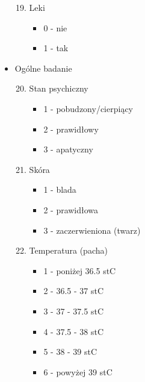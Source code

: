 \documentclass{report}
\begin{document}
\begin{itemize}
        \begin{enumerate}
            \setcounter{enumi}{18}
            \item Leki
            \begin{itemize}
                \item 0 - nie
                \item 1 - tak
            \end{itemize}
        \end{enumerate}
        \item Ogólne badanie
        \begin{enumerate}
            \setcounter{enumi}{19}
            \item Stan psychiczny
            \begin{itemize}
                \item 1 - pobudzony/cierpiący
                \item 2 - prawidłowy
                \item 3 - apatyczny
            \end{itemize}
        \end{enumerate}
        \begin{enumerate}
            \setcounter{enumi}{20}
            \item Skóra
            \begin{itemize}
                \item 1 - blada
                \item 2 - prawidłowa
                \item 3 - zaczerwieniona (twarz)
            \end{itemize}
        \end{enumerate}
        \begin{enumerate}
            \setcounter{enumi}{21}
            \item Temperatura (pacha)
            \begin{itemize}
                \item 1 - poniżej 36.5 stC
                \item 2 - 36.5 - 37 stC
                \item 3 - 37 - 37.5 stC
                \item 4 - 37.5 - 38 stC
                \item 5 - 38 - 39 stC
                \item 6 - powyżej 39 stC
            \end{itemize}
        \end{enumerate}

\end{itemize}
\end{document}
